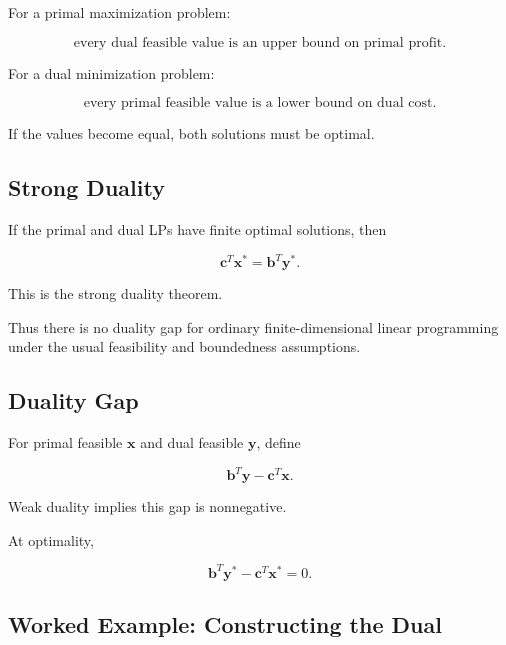 For a primal maximization problem:

\[
\boxed{
\text{every dual feasible value is an upper bound on primal profit}.
}
\]

For a dual minimization problem:

\[
\boxed{
\text{every primal feasible value is a lower bound on dual cost}.
}
\]

If the values become equal, both solutions must be optimal.

\subsection{Strong Duality}
\label{subsec:strong-duality}

If the primal and dual LPs have finite optimal solutions, then

\[
\boxed{
\mathbf{c}^T\mathbf{x}^*
=
\mathbf{b}^T\mathbf{y}^*.
}
\]

This is the strong duality theorem.

Thus there is no duality gap for ordinary finite-dimensional linear
programming under the usual feasibility and boundedness assumptions.

\subsection{Duality Gap}
\label{subsec:lp-duality-gap}

For primal feasible \(\mathbf{x}\) and dual feasible \(\mathbf{y}\), define

\[
\boxed{
\mathbf{b}^T\mathbf{y}
-
\mathbf{c}^T\mathbf{x}.
}
\]

Weak duality implies this gap is nonnegative.

At optimality,

\[
\boxed{
\mathbf{b}^T\mathbf{y}^*
-
\mathbf{c}^T\mathbf{x}^*
=
0.
}
\]

\subsection{Worked Example: Constructing the Dual}
\label{subsec:worked-lp-dual}

